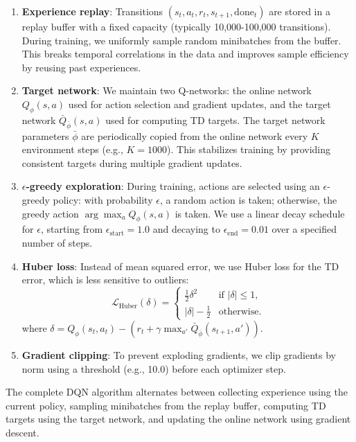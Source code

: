 \documentclass[11pt, a4paper, oneside]{memoir}
\begin{document}
\begin{enumerate}
\item \textbf{Experience replay}: Transitions $(s_t, a_t, r_t, s_{t+1}, \text{done}_t)$ are stored in a replay buffer with a fixed capacity (typically 10,000-100,000 transitions). During training, we uniformly sample random minibatches from the buffer. This breaks temporal correlations in the data and improves sample efficiency by reusing past experiences.

\item \textbf{Target network}: We maintain two Q-networks: the online network $Q_\phi(s, a)$ used for action selection and gradient updates, and the target network $\bar{Q}_{\bar{\phi}}(s, a)$ used for computing TD targets. The target network parameters $\bar{\phi}$ are periodically copied from the online network every $K$ environment steps (e.g., $K = 1000$). This stabilizes training by providing consistent targets during multiple gradient updates.

\item \textbf{$\epsilon$-greedy exploration}: During training, actions are selected using an $\epsilon$-greedy policy: with probability $\epsilon$, a random action is taken; otherwise, the greedy action $\arg\max_a Q_\phi(s, a)$ is taken. We use a linear decay schedule for $\epsilon$, starting from $\epsilon_{\text{start}} = 1.0$ and decaying to $\epsilon_{\text{end}} = 0.01$ over a specified number of steps.

\item \textbf{Huber loss}: Instead of mean squared error, we use Huber loss for the TD error, which is less sensitive to outliers:
\begin{equation}
\mathcal{L}_{\text{Huber}}(\delta) = \begin{cases}
\frac{1}{2}\delta^2 & \text{if } |\delta| \leq 1, \\
|\delta| - \frac{1}{2} & \text{otherwise}.
\end{cases}
\end{equation}
where $\delta = Q_\phi(s_t, a_t) - (r_t + \gamma \max_{a'} \bar{Q}_{\bar{\phi}}(s_{t+1}, a'))$.

\item \textbf{Gradient clipping}: To prevent exploding gradients, we clip gradients by norm using a threshold (e.g., 10.0) before each optimizer step.
\end{enumerate}

The complete DQN algorithm alternates between collecting experience using the current policy, sampling minibatches from the replay buffer, computing TD targets using the target network, and updating the online network using gradient descent.
\end{document}
